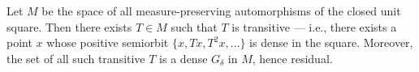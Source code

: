 Let $M$ be the space of all measure-preserving automorphisms of the closed unit square. Then there exists $T \in M$ such that $T$ is transitive — i.e., there exists a point $x$ whose positive semiorbit $\{x, Tx, T^2x, \ldots\}$ is dense in the square. Moreover, the set of all such transitive $T$ is a dense $G_{\delta}$ in $M$, hence residual.
